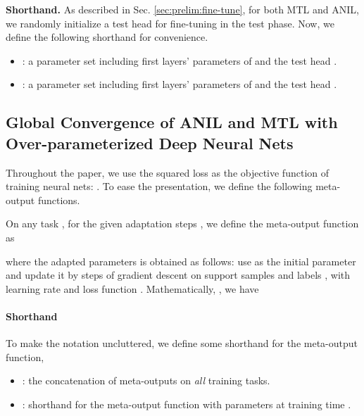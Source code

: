 \documentclass{article}
\begin{document}
\textbf{Shorthand.} As described in Sec. \ref{sec:prelim:fine-tune}, for both MTL and ANIL, we randomly initialize a test head  for fine-tuning in the test phase. Now, we define the following shorthand for convenience.
\begin{itemize}
    \item : a parameter set including first  layers' parameters of  and the test head . 
\item : a parameter set including first  layers' parameters of  and the test head .
\end{itemize}
















\subsection{Global Convergence of ANIL and MTL with Over-parameterized Deep Neural Nets}\label{supp:proof:global-convergence}
Throughout the paper, we use the squared loss as the objective function of training neural nets: . To ease the presentation, we define the following meta-output functions.
\begin{definition} On any task , for the given adaptation steps , we define the meta-output function as 
     
        where the adapted parameters  is obtained as follows: 
        use  as the initial parameter and update it by  steps of gradient descent on support samples and labels , with learning rate  and loss function . Mathematically, , we have
        
\end{definition}

\paragraph{Shorthand} To make the notation uncluttered, we define some shorthand for the meta-output function,
    \begin{itemize}
        \item : the concatenation of meta-outputs on \textit{all} training tasks. 
        \item : shorthand for the meta-output function with parameters  at training time .
    \end{itemize}
\end{document}
